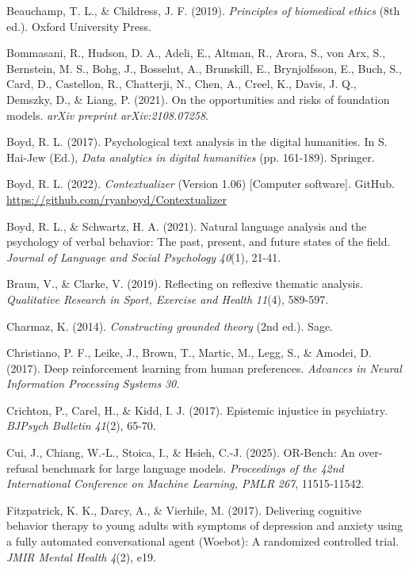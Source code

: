 \documentclass[11pt]{article}
\begin{document}
\hangindent=0.5in  Beauchamp, T. L., \& Childress, J. F. (2019). \emph{Principles of biomedical ethics} (8th ed.). Oxford University Press.\par
\hangindent=0.5in  Bommasani, R., Hudson, D. A., Adeli, E., Altman, R., Arora, S., von Arx, S., Bernstein, M. S., Bohg, J., Bosselut, A., Brunskill, E., Brynjolfsson, E., Buch, S., Card, D., Castellon, R., Chatterji, N., Chen, A., Creel, K., Davis, J. Q., Demszky, D., \& Liang, P. (2021). On the opportunities and risks of foundation models. \emph{arXiv preprint arXiv:2108.07258}.\par
\hangindent=0.5in  Boyd, R. L. (2017). Psychological text analysis in the digital humanities. In S. Hai-Jew (Ed.), \emph{Data analytics in digital humanities} (pp. 161-189). Springer.\par
\hangindent=0.5in  Boyd, R. L. (2022). \emph{Contextualizer} (Version 1.06) [Computer software]. GitHub. \url{https://github.com/ryanboyd/Contextualizer}\par
\hangindent=0.5in  Boyd, R. L., \& Schwartz, H. A. (2021). Natural language analysis and the psychology of verbal behavior: The past, present, and future states of the field. \emph{Journal of Language and Social Psychology} \emph{40}(1), 21-41.\par
\hangindent=0.5in  Braun, V., \& Clarke, V. (2019). Reflecting on reflexive thematic analysis. \emph{Qualitative Research in Sport, Exercise and Health} \emph{11}(4), 589-597.\par
\hangindent=0.5in  Charmaz, K. (2014). \emph{Constructing grounded theory} (2nd ed.). Sage.\par
\hangindent=0.5in  Christiano, P. F., Leike, J., Brown, T., Martic, M., Legg, S., \& Amodei, D. (2017). Deep reinforcement learning from human preferences. \emph{Advances in Neural Information Processing Systems} \emph{30}.\par
\hangindent=0.5in  Crichton, P., Carel, H., \& Kidd, I. J. (2017). Epistemic injustice in psychiatry. \emph{BJPsych Bulletin} \emph{41}(2), 65-70.\par
\hangindent=0.5in  Cui, J., Chiang, W.-L., Stoica, I., \& Hsieh, C.-J. (2025). OR-Bench: An over-refusal benchmark for large language models. \emph{Proceedings of the 42nd International Conference on Machine Learning, PMLR} \emph{267}, 11515-11542.\par
\hangindent=0.5in  Fitzpatrick, K. K., Darcy, A., \& Vierhile, M. (2017). Delivering cognitive behavior therapy to young adults with symptoms of depression and anxiety using a fully automated conversational agent (Woebot): A randomized controlled trial. \emph{JMIR Mental Health} \emph{4}(2), e19.\par
\end{document}
